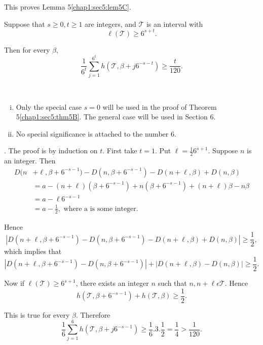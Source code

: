 This proves Lemma 5\ref{chap1:sec5:lem5C}.

\begin{lemma}\label{chap1:sec5:lem5D}
Suppose that $s \geq 0, t \geq 1$ are integers, and $\mathscr{T}$ is an interval with
$$
\ell (\mathscr{T}) \geq 6^{s+t}.
$$
\end{lemma}

Then for every $\beta$,
$$
\frac{1}{6^{t}} \sum_{j=1}^{6^{t}} h(\mathscr{T}, \beta + j 6^{-s-t}) \geq \frac{t}{120}.
$$

\begin{remarks*}
~
\begin{enumerate}[(i)]
        \item Only the special case $s = 0$ will be used in the proof of       Theorem 5\ref{chap1:sec5:thm5B}. The general case will be used in Section 6. 
        \item No special significance is attached to the number 6. 
\end{enumerate}
\end{remarks*}

. The proof is by induction on $t$. First take $t = 1$. Put $\ell = \frac{1}{2} 6^{s+1}$. Suppose $n$ is an integer. Then
\begin{align*}
D(n & + \ell, \beta + 6^{-s-1}) - D(n, \beta + 6^{-s-1}) - D(n+\ell, \beta) + D(n, \beta)\\
& = a - (n + \ell)(\beta + 6^{-s-1}) +n(\beta + 6^{-s-1}) + (n+\ell)\beta - n\beta\\
& = a - \ell 6^{-s-1}\\
& = a - \frac{1}{2}, \text{ where a is some integer. }
\end{align*}

Hence\pageoriginale
$$
\left|D(n + \ell, \beta + 6^{-s-1}) - D(n, \beta + 6^{-s-1}) - D(n + \ell, \beta) + D(n, \beta)\right| \geq \frac{1}{2},
$$
which implies that
$$
\left|D(n + \ell, \beta + 6^{-s-1}) - D(n, \beta + 6^{-s-1})\right| + \left|D(n + \ell, \beta) -D(n, \beta)\right|\geq \frac{1}{2}.
$$

Now if $\ell (\mathscr{T}) \geq 6^{s+1}$, there exists an integer $n$ such that $n, n + \ell \epsilon \mathscr{T}$. Hence
$$
h(\mathscr{T}, \beta + 6^{-s-1}) + h(\mathscr{T}, \beta)\geq \frac{1}{2}.
$$

This is true for every $\beta$. Therefore
$$
\frac{1}{6} \sum_{j=1}^{6} h(\mathscr{T}, \beta + j 6^{-s-1}) \geq \frac{1}{6} . 3 . \frac{1}{2} = \frac{1}{4} > \frac{1}{120}.
$$

